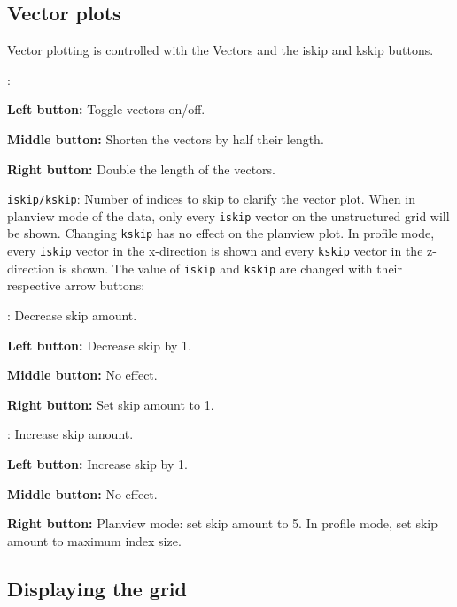 \documentclass[12pt,oneside]{article}
\begin{document}
\subsection{Vector plots}

Vector plotting is controlled with the Vectors and the iskip and kskip buttons.
\begin{list}{}
\item {}:
\begin{list}{}
\item {\bf Left button:} Toggle vectors on/off.
\item {\bf Middle button:} Shorten the vectors by half their length.
\item {\bf Right button:} Double the length of the vectors.
\end{list}
\begin{list}{}
\item \verb+iskip/kskip+: Number of indices to skip to clarify the vector plot.
When in planview mode of the data, only every \verb+iskip+ vector on the unstructured
grid will be shown. Changing \verb+kskip+ has no
effect on the planview plot.
In profile mode, every \verb+iskip+ vector in the x-direction is shown and 
every \verb+kskip+ vector in the z-direction is shown.  The value of \verb+iskip+
and \verb+kskip+ are changed with their respective arrow buttons:
\begin{list}{}
\item \button{$<$}: Decrease skip amount.
\begin{list}{}
\item {\bf Left button:} Decrease skip by 1.
\item {\bf Middle button:} No effect.
\item {\bf Right button:} Set skip amount to 1.
\end{list}
\item \button{$>$}: Increase skip amount.
\begin{list}{}
\item {\bf Left button:} Increase skip by 1.
\item {\bf Middle button:} No effect.
\item {\bf Right button:} Planview mode: set skip amount to 5.  In profile mode, set skip
amount to maximum index size.
\end{list}
\end{list}
\end{list}
\end{list}

\subsection{Displaying the grid}
\end{document}
